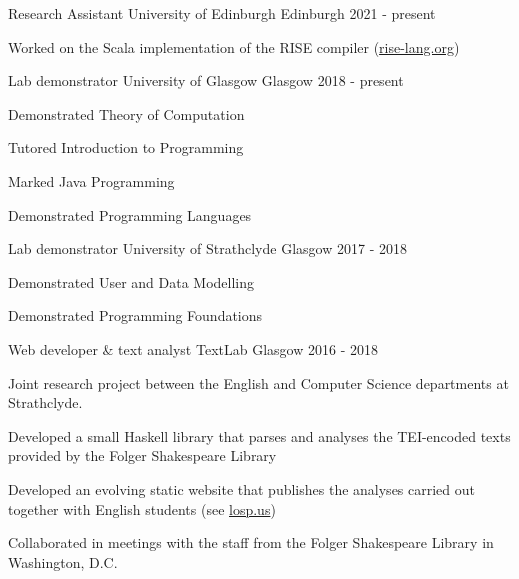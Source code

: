 \documentclass[11pt, a4paper]{awesome-cv}
\begin{document}

\begin{cventries}

    \cventry
      {Research Assistant} %
      {University of Edinburgh} %
      {Edinburgh} %
      {2021 - present} %
      {
        \begin{cvitems} %
        \item {Worked on the Scala implementation of the RISE compiler (\url{rise-lang.org})}
        \end{cvitems}
      }

    \cventry
      {Lab demonstrator} %
      {University of Glasgow} %
      {Glasgow} %
      {2018 - present} %
      {
        \begin{cvitems} %
          \item {Demonstrated Theory of Computation}
          \item {Tutored Introduction to Programming}
          \item {Marked Java Programming}
          \item {Demonstrated Programming Languages}
        \end{cvitems}
      }

    \cventry
      {Lab demonstrator} %
      {University of Strathclyde} %
      {Glasgow} %
      {2017 - 2018} %
      {
        \begin{cvitems} %
          \item {Demonstrated User and Data Modelling}
          \item {Demonstrated Programming Foundations}
        \end{cvitems}
      }

    \cventry
      {Web developer \& text analyst} %
      {TextLab}
      {Glasgow} %
      {2016 - 2018} %
      {
        Joint research project between the English and Computer Science
        departments at Strathclyde.\vspace{1.1\baselineskip}
        \begin{cvitems} %
          \item {Developed a small Haskell library that parses and analyses the
              TEI-encoded texts provided by the Folger Shakespeare Library}
          \item {Developed an evolving static website that publishes the
              analyses carried out together with English students (see
                \url{losp.us})}
          \item {Collaborated in meetings with the staff from the Folger
              Shakespeare Library in Washington, D.C.}
        \end{cvitems}
      }


\end{cventries}
\end{document}
